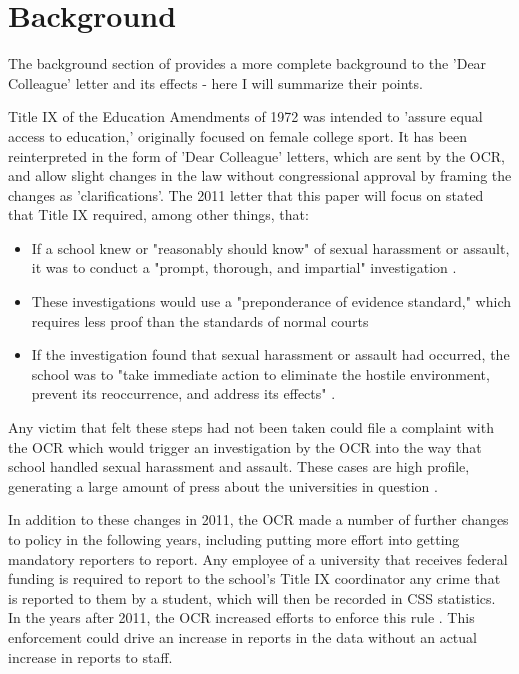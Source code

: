 \documentclass[AER,draftmode]{AEA}
\begin{document}
\section{Background}

The background section of \cite{lindo_any_2018} provides a more complete background to the 'Dear Colleague' letter and its effects - here I will summarize their points. 

Title IX of the Education Amendments of 1972 was intended to 'assure equal access to education,' originally focused on female college sport. It has been reinterpreted in the form of 'Dear Colleague' letters, which are sent by the OCR, and allow slight changes in the law without congressional approval by framing the changes as 'clarifications'. The 2011 letter that this paper will focus on stated that Title IX required, among other things, that:

\begin{itemize}

\item If a school knew or "reasonably should know" of sexual harassment or assault, it was to conduct a "prompt, thorough, and impartial" investigation \cite{ali_dear_2011}.

\item These investigations would use a "preponderance of evidence standard," which requires less proof than the standards of normal courts \cite{lindo_any_2018}

\item If the investigation found that sexual harassment or assault had occurred, the school was to "take immediate action to eliminate the hostile environment, prevent its reoccurrence, and address its effects"  \cite{ali_dear_2011}. 

\end{itemize}

Any victim that felt these steps had not been taken could file a complaint with the OCR which would trigger an investigation by the OCR into the way that school handled sexual harassment and assault. These cases are high profile, generating a large amount of press about the universities in question \cite{lindo_any_2018}. 

In addition to these changes in 2011, the OCR made a number of further changes to policy in the following years, including putting more effort into getting mandatory reporters to report. Any employee of a university that receives federal funding is required to report to the school's Title IX coordinator any crime that is reported to them by a student, which will then be recorded in CSS statistics. In the years after 2011, the OCR increased efforts to enforce this rule . This enforcement could drive an increase in reports in the data without an actual increase in reports to staff.
\end{document}
